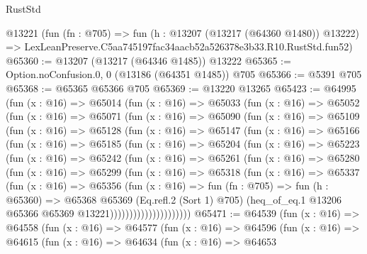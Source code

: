 \begin{lexlean}{RustStd}
\begin{coremodule}
    @13221
    (fun (fn : @705) =>
    fun (h : @13207 (@13217 (@64360 @1480)) @13222) =>
    LexLeanPreserve.C5aa745197fac34aacb52a526378e3b33.R10.RustStd.fun52)
@65360 := @13207 (@13217 (@64346 @1485)) @13222
@65365 := Option.noConfusion.{0, 0} (@13186 (@64351 @1485)) @705
@65366 := @5391 @705
@65368 := @65365 @65366 @705
@65369 := @13220 @13265
@65423 := @64995
    (fun (x : @16) =>
    @65014
      (fun (x : @16) =>
      @65033
        (fun (x : @16) =>
        @65052
          (fun (x : @16) =>
          @65071
            (fun (x : @16) =>
            @65090
              (fun (x : @16) =>
              @65109
                (fun (x : @16) =>
                @65128
                  (fun (x : @16) =>
                  @65147
                    (fun (x : @16) =>
                    @65166
                      (fun (x : @16) =>
                      @65185
                        (fun (x : @16) =>
                        @65204
                          (fun (x : @16) =>
                          @65223
                            (fun (x : @16) =>
                            @65242
                              (fun (x : @16) =>
                              @65261
                                (fun (x : @16) =>
                                @65280
                                  (fun (x : @16) =>
                                  @65299
                                    (fun (x : @16) =>
                                    @65318
                                      (fun (x : @16) =>
                                      @65337
                                        (fun (x : @16) =>
                                        @65356
                                          (fun (x : @16) =>
                                          fun (fn : @705) =>
                                          fun (h : @65360) =>
                                          @65368
                                            @65369
                                            (Eq.refl.{2} (Sort 1) @705)
                                            (heq_of_eq.{1}
                                              @13206
                                              @65366
                                              @65369
                                              @13221)))))))))))))))))))))
@65471 := @64539
    (fun (x : @16) =>
    @64558
      (fun (x : @16) =>
      @64577
        (fun (x : @16) =>
        @64596
          (fun (x : @16) =>
          @64615
            (fun (x : @16) =>
            @64634
              (fun (x : @16) =>
              @64653

\end{coremodule}
\end{lexlean}
